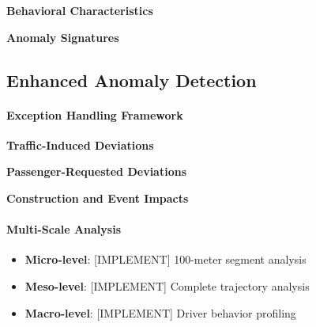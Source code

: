 \documentclass[runningheads]{llncs}
\begin{document}
\textbf{Behavioral Characteristics}

\textbf{Anomaly Signatures}

\subsection{Enhanced Anomaly Detection}
\label{sec:improve}


\paragraph{Exception Handling Framework}

\textbf{Traffic-Induced Deviations}

\textbf{Passenger-Requested Deviations}

\textbf{Construction and Event Impacts}

\paragraph{Multi-Scale Analysis}
\begin{itemize}
\item \textbf{Micro-level}: [IMPLEMENT] 100-meter segment analysis
\item \textbf{Meso-level}: [IMPLEMENT] Complete trajectory analysis  
\item \textbf{Macro-level}: [IMPLEMENT] Driver behavior profiling
\end{itemize}
\end{document}
